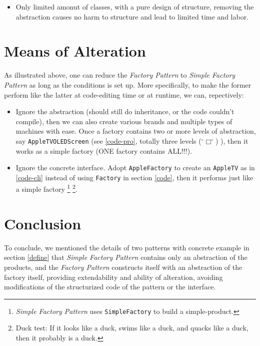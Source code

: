 \documentclass[a4paper]{article}
\newcommand{\kora}{%
(\raisebox{0.5em}{\rotatebox{-45}{)}}$^{\circ}{\scriptscriptstyle\Box}^{\circ}$)\raisebox{0.5em}{\rotatebox{-45}{)}}\rotatebox{90}{)}\raisebox{0.2em}{\LARGE \_\hskip-.1em\textvisiblespace\hskip-.1em\_}
}
\begin{document}
\begin{itemize}
    \item Only limited amonut of classes, with a pure design of structure,
        removing the abstraction causes no harm to structure and lead to limited time and labor.
\end{itemize}

\section{Means of Alteration}\label{means}

As illustrated above, one can reduce the \textit{Factory Pattern} to \textit{Simple Factory Pattern}
as long as the conditions is set up. More specifically, to make the former perform like
the latter at code-editing time or at runtime, we can, repectively:

\begin{itemize}
    \item\label{itm:programmer} Ignore the abstraction (should still do inheritance, or the code couldn't compile), then we can also create various brands and
        multiple types of machines with ease. Once a factory contains two or more levels of abstraction,
        say \texttt{AppleTVOLEDScreen} (see \ref{code-pro}, totally three levels \kora), then it works as a simple factory (ONE factory contains ALL!!!).
    \item\label{itm:client} Ignore the concrete interface. Adopt \texttt{AppleFactory} to create an \texttt{AppleTV} as in \ref{code-cli} instead of
        using \texttt{Factory} in section \ref{code}, then it performs just like a simple factory
        \footnote{\textit{Simple Factory Pattern} uses \texttt{SimpleFactory} to build a simple-product.}
        \footnote{Duck test: If it looks like a duck, swims like a duck, and quacks like a duck, then it probably is a duck.}.
\end{itemize}

\section{Conclusion}

To conclude, we mentioned the details of two patterns with concrete example in section \ref{define} that
\textit{Simple Factory Pattern} contains only an abstraction of the products,
and the \textit{Factory Pattern} constructs itself with an abstraction of
the factory itself, providing extendability and ability of alteration, avoiding
modifications of the structurized code of the pattern or the interface.
\end{document}
